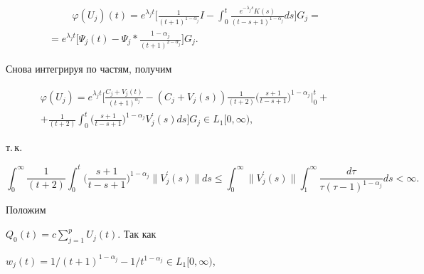 \begin{multline}


\hspace{1cm}


\varphi(U_j)(t)=e^{\lambda_jt}\bigg[\frac{1}{(t+1)^{1- \alpha_j}} I-


\int_0^t \frac{e^{- \lambda_js}K(s)}{(t-s+1)^{1- \alpha_j}} ds \bigg]


G_j= \\


%


=e^{\lambda_j t}\bigg[\Psi_j (t)-\Psi_j \ast \frac {1- \alpha_j}


{(t+1)^{2- \alpha_j}}\bigg]G_j.


\end{multline}


Снова интегрируя по частям, получим


\begin{multline}


\varphi(U_j)=e^{\lambda_jt}\bigg[\frac {C_j+V_j(t)}{(t+1)^{ \alpha_j}} -


(C_j+V_j(s))\frac{1}{(t+2)}\bigg(\frac {s+1}{t-s+1}\bigg)^{1-\alpha_j}


\bigg|_0^t+\\


%


+\frac{1}{(t+2)}


\int_0^t \bigg (\frac {s+1}{t-s+1}\bigg )^{1-\alpha_j}V_j ^\prime (s)


ds\bigg ]G_j \in L_1 [0,\infty),


\end{multline}


т.\,к.


$$


\int_0^\infty


\frac{1}{(t+2)} \int_0^t


\bigg( \frac {s+1}{t-s+1} \bigg)^{1-\alpha_j} \| V_j ^\prime (s)


\| ds \leq \int_0^\infty \| V_j ^\prime (s) \| \int_1^\infty


\frac{d \tau}{\tau ( \tau -1)^{1- \alpha_j}} ds < \infty.


$$





Положим


$Q_0(t)=c \sum \limits_{j=1}^p U_j(t).$ Так как


$w_j(t)={1}/{(t+1)^{1- \alpha_j}}


-{1}/{t^{ 1-\alpha_j}} \in L_1 [0,\infty)$,


